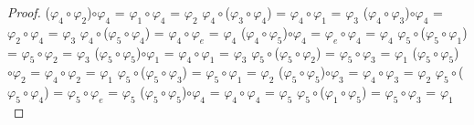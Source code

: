 \documentclass[10pt,a4paper,oneside]{article}
\begin{document}
\begin{proof}
				\newline
				($\varphi_{4}\circ\varphi_{2}$)$\circ\varphi_{4}$ = $\varphi_{1}\circ\varphi_{4}$ = $\varphi_{2}$
				\newline
				\newline
				$\varphi_{4}\circ$($\varphi_{3}\circ\varphi_{4}$) = $\varphi_{4}\circ\varphi_{1}$ = $\varphi_{3}$
				\newline
				($\varphi_{4}\circ\varphi_{3}$)$\circ\varphi_{4}$ = $\varphi_{2}\circ\varphi_{4}$ = $\varphi_{3}$
				\newline
				\newline
				$\varphi_{4}\circ$($\varphi_{5}\circ\varphi_{4}$) = $\varphi_{4}\circ\varphi_{e}$ = $\varphi_{4}$
				\newline
				($\varphi_{4}\circ\varphi_{5}$)$\circ\varphi_{4}$ = $\varphi_{e}\circ\varphi_{4}$ = $\varphi_{4}$
				\newline
				\newline
				$\varphi_{5}\circ$($\varphi_{5}\circ\varphi_{1}$) = $\varphi_{5}\circ\varphi_{2}$ = $\varphi_{3}$
				\newline
				($\varphi_{5}\circ\varphi_{5}$)$\circ\varphi_{1}$ = $\varphi_{4}\circ\varphi_{1}$ = $\varphi_{3}$
				\newline
				\newline
				$\varphi_{5}\circ$($\varphi_{5}\circ\varphi_{2}$) = $\varphi_{5}\circ\varphi_{3}$ = $\varphi_{1}$
				\newline
				($\varphi_{5}\circ\varphi_{5}$)$\circ\varphi_{2}$ = $\varphi_{4}\circ\varphi_{2}$ = $\varphi_{1}$
				\newline
				\newline
				$\varphi_{5}\circ$($\varphi_{5}\circ\varphi_{3}$) = $\varphi_{5}\circ\varphi_{1}$ = $\varphi_{2}$
				\newline
				($\varphi_{5}\circ\varphi_{5}$)$\circ\varphi_{3}$ = $\varphi_{4}\circ\varphi_{3}$ = $\varphi_{2}$
				\newline
				\newline
				$\varphi_{5}\circ$($\varphi_{5}\circ\varphi_{4}$) = $\varphi_{5}\circ\varphi_{e}$ = $\varphi_{5}$
				\newline
				($\varphi_{5}\circ\varphi_{5}$)$\circ\varphi_{4}$ = $\varphi_{4}\circ\varphi_{4}$ = $\varphi_{5}$
				\newline
				\newline
				$\varphi_{5}\circ$($\varphi_{1}\circ\varphi_{5}$) = $\varphi_{5}\circ\varphi_{3}$ = $\varphi_{1}$
				\newline

\end{proof}
\end{document}
